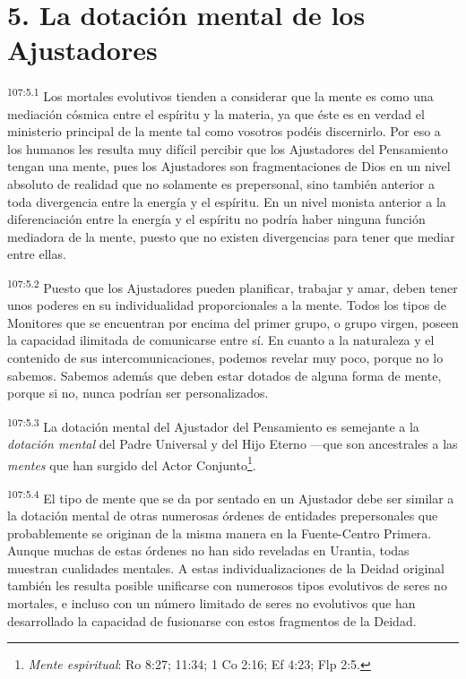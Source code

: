 \documentclass[twoside, 11pt]{book}
\begin{document}
\section*{5. La dotación mental de los Ajustadores}
\par
\textsuperscript{107:5.1} Los mortales evolutivos tienden a considerar que la mente es como una mediación cósmica entre el espíritu y la materia, ya que éste es en verdad el ministerio principal de la mente tal como vosotros podéis discernirlo. Por eso a los humanos les resulta muy difícil percibir que los Ajustadores del Pensamiento tengan una mente, pues los Ajustadores son fragmentaciones de Dios en un nivel absoluto de realidad que no solamente es prepersonal, sino también anterior a toda divergencia entre la energía y el espíritu. En un nivel monista anterior a la diferenciación entre la energía y el espíritu no podría haber ninguna función mediadora de la mente, puesto que no existen divergencias para tener que mediar entre ellas.

\par
\textsuperscript{107:5.2} Puesto que los Ajustadores pueden planificar, trabajar y amar, deben tener unos poderes en su individualidad proporcionales a la mente. Todos los tipos de Monitores que se encuentran por encima del primer grupo, o grupo virgen, poseen la capacidad ilimitada de comunicarse entre sí. En cuanto a la naturaleza y el contenido de sus intercomunicaciones, podemos revelar muy poco, porque no lo sabemos. Sabemos además que deben estar dotados de alguna forma de mente, porque si no, nunca podrían ser personalizados.

\par
\textsuperscript{107:5.3} La dotación mental del Ajustador del Pensamiento es semejante a la \textit{dotación mental} del Padre Universal y del Hijo Eterno ---que son ancestrales a las \textit{mentes} que han surgido del Actor Conjunto\footnote{\textit{Mente espiritual}: Ro 8:27; 11:34; 1 Co 2:16; Ef 4:23; Flp 2:5.}.

\par
\textsuperscript{107:5.4} El tipo de mente que se da por sentado en un Ajustador debe ser similar a la dotación mental de otras numerosas órdenes de entidades prepersonales que probablemente se originan de la misma manera en la Fuente-Centro Primera. Aunque muchas de estas órdenes no han sido reveladas en Urantia, todas muestran cualidades mentales. A estas individualizaciones de la Deidad original también les resulta posible unificarse con numerosos tipos evolutivos de seres no mortales, e incluso con un número limitado de seres no evolutivos que han desarrollado la capacidad de fusionarse con estos fragmentos de la Deidad.
\end{document}
